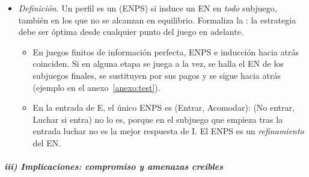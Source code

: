 \documentclass[11pt]{article}
\begin{document}
\begin{itemize}
\begin{itemize}
  \end{itemize}
\item \emph{Definición}\nocite{Selten1965Spieltheoretische}. Un perfil es un  (ENPS) si induce un EN en \emph{todo} subjuego, también en los que no se alcanzan en equilibrio. Formaliza la : la estrategia debe ser óptima desde cualquier punto del juego en adelante.
  \begin{itemize}
  \item En juegos finitos de información perfecta, ENPS e inducción hacia atrás coinciden. Si en alguna etapa se juega a la vez, se halla el EN de los subjuegos finales, se sustituyen por sus pagos y se sigue hacia atrás (ejemplo en el anexo~\ref{anexo:test}).
  \item En la entrada de E, el único ENPS es (Entrar, Acomodar): (No entrar, Luchar si entra) no lo es, porque en el subjuego que empieza tras la entrada luchar no es la mejor respuesta de \textup{I}. El ENPS es un \emph{refinamiento} del EN.
  \end{itemize}
\end{itemize}

\subparagraph{iii) Implicaciones: compromiso y amenazas creíbles}
\end{document}
